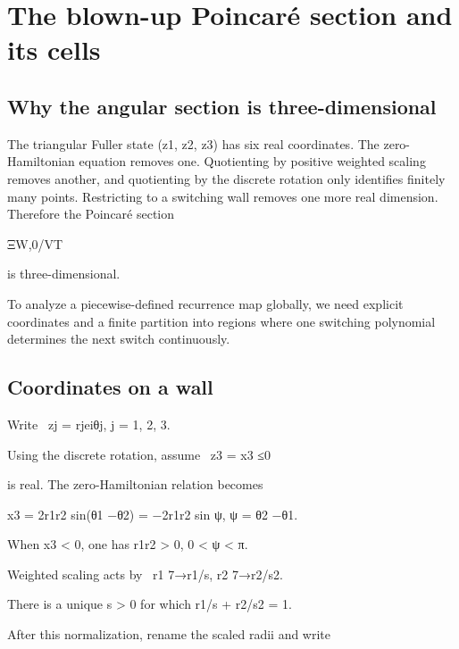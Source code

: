 \chapter{The blown-up Poincaré section and its cells}
\section{Why the angular section is three-dimensional}

The triangular Fuller state (z1, z2, z3) has six real coordinates. The zero-Hamiltonian equation removes one. Quotienting by positive weighted scaling removes another, and quotienting by the discrete rotation only identifies finitely many points. Restricting to a switching wall removes one more real dimension. Therefore the Poincaré section


ΞW,0/VT


is three-dimensional.


To analyze a piecewise-defined recurrence map globally, we need explicit coordinates and a finite partition into regions where one switching polynomial determines the next switch continuously.


\section{Coordinates on a wall}

\begin{displaytext}
Write \
zj = rjeiθj, j = 1, 2, 3.
\end{displaytext}

\begin{displaytext}
Using the discrete rotation, assume \
z3 = x3 ≤0
\end{displaytext}

is real. The zero-Hamiltonian relation becomes


\begin{displaytext}
x3 = 2r1r2 sin(θ1 −θ2) = −2r1r2 sin ψ, ψ = θ2 −θ1.
\end{displaytext}

When x3 < 0, one has r1r2 > 0, 0 < ψ < π.


\begin{displaytext}
Weighted scaling acts by \
r1 7→r1/s, r2 7→r2/s2.
\end{displaytext}

There is a unique s > 0 for which r1/s + r2/s2 = 1.


After this normalization, rename the scaled radii and write


